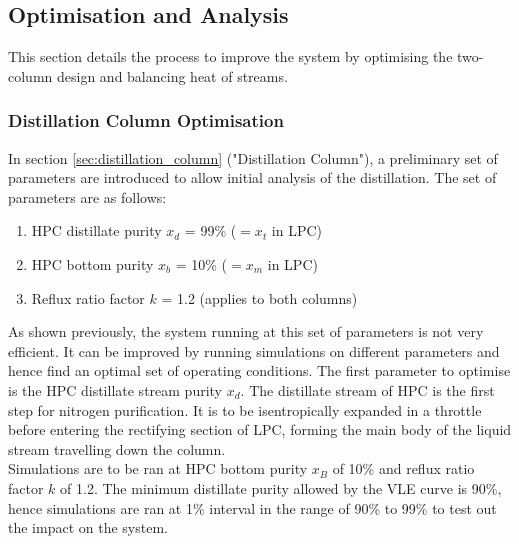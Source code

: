 \subsection{Optimisation and Analysis} \noindent \label{sec:optimisation_analysis}
This section details the process to improve the system by optimising the two-column design and balancing heat of streams.
	\subsubsection{Distillation Column Optimisation} \noindent
	In section \ref{sec:distillation_column} ("Distillation Column"), a preliminary set of parameters are introduced to allow initial analysis of the distillation. The set of parameters are as follows:
    \begin{enumerate}
        \item HPC distillate purity $x_d$ = 99\% ($=x_t$ in LPC)
        \item HPC bottom purity $x_b$ = 10\% ($=x_m$ in LPC)
        \item Reflux ratio factor $k$ = 1.2 (applies to both columns)
    \end{enumerate}
    As shown previously, the system running at this set of parameters is not very efficient. It can be improved by running simulations on different parameters and hence find an optimal set of operating conditions.
    The first parameter to optimise is the HPC distillate stream purity $x_d$. The distillate stream of HPC is the first step for nitrogen purification. It is to be isentropically expanded in a throttle before entering the rectifying section of LPC, forming the main body of the liquid stream travelling down the column. \\
    Simulations are to be ran at HPC bottom purity $x_B$ of 10\% and reflux ratio factor $k$ of 1.2. The minimum distillate purity allowed by the VLE curve is 90\%, hence simulations are ran at 1\% interval in the range of 90\% to 99\% to test out the impact on the system. \\
    
